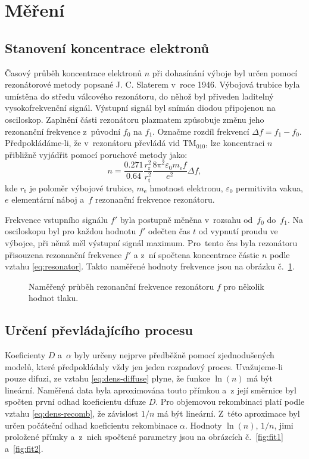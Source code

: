 \documentclass{protokol}
\newcommand\emass{m_\mathrm{e}}
\newcommand\elemcharge{e}
\newcommand\permitvac{\varepsilon_0}
\newcommand\tm{t}
\newcommand\freq{f}
\newcommand\freqbase{\freq_0}
\newcommand\freqplas{\freq_1}
\newcommand\freqsig{\freq'}
\newcommand\deltafreq{\Delta\freq}
\newcommand\dens{n}
\newcommand\diffuse{D}
\newcommand\recomb{\alpha}
\newcommand\tuberadius{r_\mathrm{t}}
\newcommand\resradius{r_\mathrm{r}}
\begin{document}
\section{Měření}

\subsection{Stanovení koncentrace elektronů}
Časový průběh koncentrace elektronů $\dens$ při dohasínání výboje
byl určen pomocí rezonátorové metody popsané J. C. Slaterem v~roce 1946.
Výbojová trubice byla umístěna do středu válcového rezonátoru,
do něhož byl přiveden laditelný vysokofrekvenční signál.
Výstupní signál byl snímán diodou připojenou na osciloskop.
Zaplnění části rezonátoru plazmatem způsobuje změnu jeho rezonanční
frekvence z~původní $\freqbase$ na $\freqplas$.
Označme rozdíl frekvencí $\deltafreq = \freqplas - \freqbase$.
Předpokládáme-li, že v~rezonátoru převládá vid $\mathrm{TM}_{010}$,
lze koncentraci $\dens$ přibližně vyjádřit pomocí poruchové metody jako:
\begin{equation}
	\label{eq:resonator}
	\dens=\frac{\num{0.271}}{\num{0.64}} \frac{\resradius^2}{\tuberadius^2}
		\frac{8\pi^2 \permitvac\emass\freq}{\elemcharge^2} \deltafreq,
\end{equation}
kde $\tuberadius$ je poloměr výbojové trubice, $\emass$ hmotnost elektronu,
$\permitvac$ permitivita vakua, $\elemcharge$ elementární náboj
a~$\freq$ rezonanční frekvence rezonátoru.

Frekvence vstupního signálu $\freqsig$ byla postupně měněna v~rozsahu
od~$\freqbase$ do~$\freqplas$.
Na osciloskopu byl pro každou hodnotu $\freqsig$ odečten čas $\tm$ od vypnutí
proudu ve výbojce, při němž měl výstupní signál maximum.
Pro~tento čas byla rezonátoru přisouzena rezonanční frekvence $\freqsig$
a z~ní spočtena koncentrace částic $\dens$ podle vztahu \eqref{eq:resonator}.
Takto naměřené hodnoty frekvence jsou na obrázku č.~\ref{fig:freq}.

\begin{figure}[htp]
	\centering
	
	\caption{Naměřený průběh rezonanční frekvence rezonátoru $\freq$
		pro několik hodnot tlaku.}
	\label{fig:freq}
\end{figure}

\subsection{Určení převládajícího procesu}
Koeficienty $\diffuse$ a~$\recomb$ byly určeny nejprve předběžně pomocí
zjednodušených modelů, které předpokládaly vždy jen jeden rozpadový proces.
Uvažujeme-li pouze difuzi, ze vztahu \eqref{eq:dens-diffuse} plyne,
že funkce $\ln(\dens)$ má být lineární.
Naměřená data byla aproximována touto přímkou a~z její směrnice
byl spočten první odhad koeficientu difuze $\diffuse$.
Pro objemovou rekombinaci platí podle vztahu \eqref{eq:dens-recomb},
že závislost $1/\dens$ má být lineární.
Z~této aproximace byl určen počáteční odhad koeficientu rekombinace $\recomb$.
Hodnoty $\ln(\dens)$, $1/\dens$, jimi proložené přímky a~z~nich spočtené
parametry jsou na obrázcích č.~\ref{fig:fit1} a~\ref{fig:fit2}.
\end{document}
